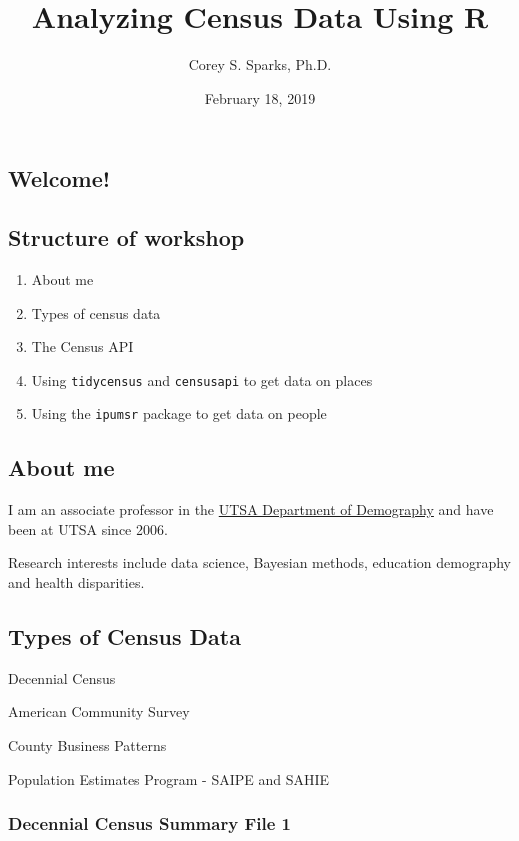 \documentclass[]{article}
\title{Analyzing Census Data Using R}
\author{Corey S. Sparks, Ph.D.}
\date{February 18, 2019}
\providecommand{\tightlist}{%
  \setlength{\itemsep}{0pt}\setlength{\parskip}{0pt}}
\begin{document}
\maketitle

{
\setcounter{tocdepth}{2}
\tableofcontents
}
\subsection{Welcome!}\label{welcome}

\subsection{Structure of workshop}\label{structure-of-workshop}

\begin{enumerate}
\def\labelenumi{\arabic{enumi})}
\tightlist
\item
  About me
\item
  Types of census data
\item
  The Census API
\item
  Using \texttt{tidycensus} and \texttt{censusapi} to get data on places
\item
  Using the \texttt{ipumsr} package to get data on people
\end{enumerate}

\subsection{About me}\label{about-me}

I am an associate professor in the
\href{http://copp.utsa.edu/demography/}{UTSA Department of Demography}
and have been at UTSA since 2006.

Research interests include data science, Bayesian methods, education
demography and health disparities. \newpage

\subsection{Types of Census Data}\label{types-of-census-data}

Decennial Census

American Community Survey

County Business Patterns

Population Estimates Program - SAIPE and SAHIE \newpage

\subsubsection{Decennial Census Summary File
1}\label{decennial-census-summary-file-1}
\end{document}
